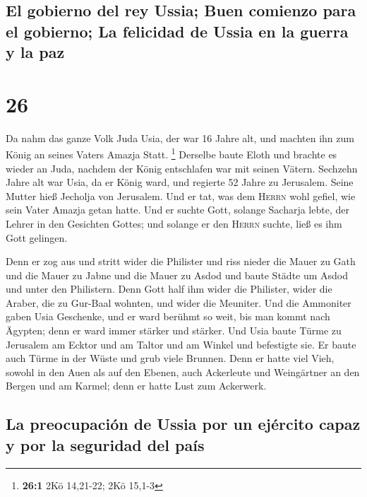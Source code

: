 \hypertarget{el-gobierno-del-rey-ussia-buen-comienzo-para-el-gobierno-la-felicidad-de-ussia-en-la-guerra-y-la-paz}{%
\subsection{El gobierno del rey Ussia; Buen comienzo para el gobierno;
La felicidad de Ussia en la guerra y la
paz}\label{el-gobierno-del-rey-ussia-buen-comienzo-para-el-gobierno-la-felicidad-de-ussia-en-la-guerra-y-la-paz}}

\hypertarget{section-25}{%
\section{26}\label{section-25}}

 Da nahm das ganze Volk Juda Usia, der war 16 Jahre alt,
und machten ihn zum König an seines Vaters Amazja Statt. \footnote{\textbf{26:1}
  2Kö 14,21-22; 2Kö 15,1-3}  Derselbe baute Eloth und
brachte es wieder an Juda, nachdem der König entschlafen war mit seinen
Vätern.  Sechzehn Jahre alt war Usia, da er König ward,
und regierte 52 Jahre zu Jerusalem. Seine Mutter hieß Jecholja von
Jerusalem.  Und er tat, was dem \textsc{Herrn} wohl
gefiel, wie sein Vater Amazja getan hatte.  Und er suchte
Gott, solange Sacharja lebte, der Lehrer in den Gesichten Gottes; und
solange er den \textsc{Herrn} suchte, ließ es ihm Gott gelingen.

 Denn er zog aus und stritt wider die Philister und riss
nieder die Mauer zu Gath und die Mauer zu Jabne und die Mauer zu Asdod
und baute Städte um Asdod und unter den Philistern.  Denn
Gott half ihm wider die Philister, wider die Araber, die zu Gur-Baal
wohnten, und wider die Meuniter.  Und die Ammoniter gaben
Usia Geschenke, und er ward berühmt so weit, bis man kommt nach Ägypten;
denn er ward immer stärker und stärker.  Und Usia baute
Türme zu Jerusalem am Ecktor und am Taltor und am Winkel und befestigte
sie.  Er baute auch Türme in der Wüste und grub viele
Brunnen. Denn er hatte viel Vieh, sowohl in den Auen als auf den Ebenen,
auch Ackerleute und Weingärtner an den Bergen und am Karmel; denn er
hatte Lust zum Ackerwerk.

\hypertarget{la-preocupaciuxf3n-de-ussia-por-un-ejuxe9rcito-capaz-y-por-la-seguridad-del-pauxeds}{%
\subsection{La preocupación de Ussia por un ejército capaz y por la
seguridad del
país}\label{la-preocupaciuxf3n-de-ussia-por-un-ejuxe9rcito-capaz-y-por-la-seguridad-del-pauxeds}}

